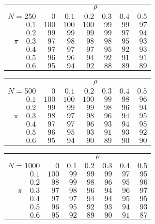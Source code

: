 \begin{tabular}{r|rrrrrr}
\hline\hline
 &\multicolumn{6}{c}{$\rho$} \\ 
 $N = 250$ & $0$ & $0.1$ & $0.2$ & $0.3$ & $0.4$ & $0.5$ \\ 
 \hline$0.1$ & $100$ & $100$ & $100$ & $99$ & $99$ & $97$\\ 
$0.2$ & $99$ & $99$ & $99$ & $99$ & $97$ & $94$\\ 
$\pi\quad$$0.3$ & $97$ & $98$ & $98$ & $98$ & $95$ & $93$\\ 
$0.4$ & $97$ & $97$ & $97$ & $95$ & $92$ & $93$\\ 
$0.5$ & $96$ & $96$ & $94$ & $92$ & $91$ & $91$\\ 
$0.6$ & $95$ & $94$ & $92$ & $88$ & $89$ & $89$\\ 
 \hline 
 \end{tabular}
 
 \vspace{2em} 
 
\begin{tabular}{r|rrrrrr}
\hline\hline
 &\multicolumn{6}{c}{$\rho$} \\ 
 $N = 500$ & $0$ & $0.1$ & $0.2$ & $0.3$ & $0.4$ & $0.5$ \\ 
 \hline$0.1$ & $100$ & $100$ & $100$ & $99$ & $98$ & $96$\\ 
$0.2$ & $99$ & $99$ & $99$ & $98$ & $96$ & $94$\\ 
$\pi\quad$$0.3$ & $98$ & $97$ & $98$ & $96$ & $94$ & $95$\\ 
$0.4$ & $97$ & $97$ & $96$ & $93$ & $94$ & $95$\\ 
$0.5$ & $96$ & $95$ & $93$ & $91$ & $93$ & $92$\\ 
$0.6$ & $95$ & $94$ & $90$ & $89$ & $90$ & $90$\\ 
 \hline 
 \end{tabular}
 
 \vspace{2em} 
 
\begin{tabular}{r|rrrrrr}
\hline\hline
 &\multicolumn{6}{c}{$\rho$} \\ 
 $N = 1000$ & $0$ & $0.1$ & $0.2$ & $0.3$ & $0.4$ & $0.5$ \\ 
 \hline$0.1$ & $100$ & $99$ & $99$ & $99$ & $97$ & $95$\\ 
$0.2$ & $98$ & $99$ & $98$ & $96$ & $95$ & $96$\\ 
$\pi\quad$$0.3$ & $97$ & $98$ & $96$ & $94$ & $96$ & $97$\\ 
$0.4$ & $97$ & $97$ & $94$ & $94$ & $95$ & $95$\\ 
$0.5$ & $96$ & $95$ & $92$ & $93$ & $94$ & $93$\\ 
$0.6$ & $95$ & $92$ & $89$ & $90$ & $91$ & $87$\\ 
 \hline 
 \end{tabular}